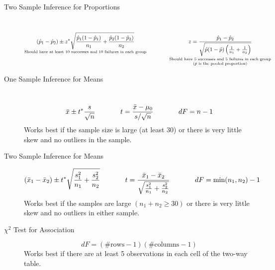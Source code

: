 \documentclass[11pt]{article}
\newcommand{\ds}{\displaystyle}
\begin{document}
\begin{description}
\item[Two Sample Inference for Proportions] ~%
\[
\underset{\text{Should have at least 10 successes and 10 failures in each group}}{\displaystyle(\hat{p}_1 - \hat{p}_2)  \pm z^* \sqrt{ \frac{\hat{p}_1(1-\hat{p}_1)}{n_1}+\frac{\hat{p}_2(1-\hat{p}_2)}{n_2} }} \hspace{0.5in} \underset{\scriptsize \begin{array}{c}\text{Should have 5 successes and 5 failures in each group} \\ (\hat{p} \text{ is the pooled proportion}) \end{array}}{ z = \frac{\hat{p}_1 - \hat{p}_2}{\sqrt{\hat{p}(1-\hat{p})\left( \frac{1}{n_1} + \frac{1}{n_2} \right)}} }
\]

\item[One Sample Inference for Means] ~
$${\bar{x} \pm t^* \frac{s}{\sqrt{n}} \hspace*{0.5in} \ds t = \frac{\bar{x} - \mu_0}{s/\sqrt{n}} \hspace*{0.5in} dF = n-1}$$
{\footnotesize Works best if the sample size is large (at least 30) or there is very little skew and no outliers in the sample. }

\item[Two Sample Inference for Means] 
\[
(\bar{x}_1 - \bar{x}_2) \pm t^* \sqrt{ \frac{s_1^2}{n_1} + \frac{s_2^2}{n_2} } \hspace*{0.5in} t = \frac{\bar{x}_1 - \bar{x}_2}{ \sqrt{ \frac{s_1^2}{n_1} + \frac{s_2^2}{n_2}} }  \hspace*{0.5in} dF = \min(n_1,n_2) - 1
\]
{\footnotesize Works best if the samples are large $(n_1 + n_2 \ge 30)$ or there is very little skew and no outliers in either sample. }

\item[$\chi^2$ Test for Association]
$$dF = (\#\text{rows}-1)(\#\text{columns}-1)$$
{\footnotesize Works best if there are at least 5 observations in each cell of the two-way table.}
\end{description}
\end{document}
